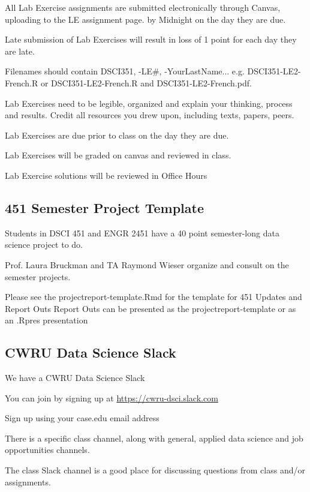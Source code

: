 \documentclass[10pt]{article} %
\begin{document}
    All Lab Exercise assignments are submitted electronically through Canvas, uploading to the LE assignment page. by Midnight on the day they are due.

    Late submission of Lab Exercises will result in loss of 1 point for each day they are late.


    Filenames should contain DSCI351, -LE\#, -YourLastName... e.g. DSCI351-LE2-French.R or DSCI351-LE2-French.R and DSCI351-LE2-French.pdf.

    Lab Exercises need to be legible, organized and explain your thinking, process and results.
    Credit all resources you drew upon, including texts, papers, peers.

    Lab Exercises are due prior to class on the day they are due.

    Lab Exercises will be graded on canvas and reviewed in class.

    Lab Exercise solutions will be reviewed in Office Hours

  \subsection{451 Semester Project Template}

    Students in DSCI 451 and ENGR 2451 have a 40 point semester-long data science project to do.

    Prof. Laura Bruckman and TA Raymond Wieser organize and consult on the semester projects.

    Please see the projectreport-template.Rmd for the template for 451 Updates and Report Outs
    Report Outs can be presented as the projectreport-template or as an .Rpres presentation



  \subsection{CWRU Data Science Slack}

    We have a CWRU Data Science Slack

    You can join by signing up at \href{https://cwru-dsci.slack.com}{https://cwru-dsci.slack.com}

    Sign up using your case.edu email address

    There is a specific class channel, along with general, applied data science and job opportunities channels.

    The class Slack channel is a good place for discussing questions from class and/or assignments.
\end{document}
